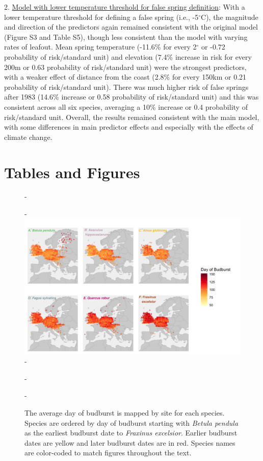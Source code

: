 \documentclass{article}\usepackage[]{graphicx}\usepackage[]{color}
\begin{document}
2. \underline{Model with lower temperature threshold for false spring definition}: With a lower temperature threshold for defining a false spring (i.e., -5$^{\circ}$C), the magnitude and direction of the predictors again remained consistent with the original model (Figure S3 and Table S5), though less consistent than the model with varying rates of leafout. Mean spring temperature (-11.6\% for every 2$^\circ$ or -0.72 probability of risk/standard unit) and elevation (7.4\% increase in risk for every 200m or 0.63 probability of risk/standard unit) were the strongest predictors, with a weaker effect of distance from the coast (2.8\% for every 150km or 0.21 probability of risk/standard unit). There was much higher risk of false springs after 1983 (14.6\% increase or 0.58 probability of risk/standard unit) and this was consistent across all six species, averaging a 10\% increase or 0.4 probability of risk/standard unit. Overall, the results remained consistent with the main model, with some differences in main predictor effects and especially with the effects of climate change.



\section*{Tables and Figures} 

{\begin{figure} [H]
  -\begin{center}
  -\includegraphics[width=14cm]{..//analyses/figures/BB_base.png}
  -\caption{The average day of budburst is mapped by site for each species. Species are ordered by day of budburst starting with \textit{Betula pendula} as the earliest budburst date to \textit{Fraxinus excelsior}. Earlier budburst dates are yellow and later budburst dates are in red. Species names are color-coded to match figures throughout the text. }\label{fig:bbmap}
  -\end{center}
  -\end{figure}}
  
\end{document}
